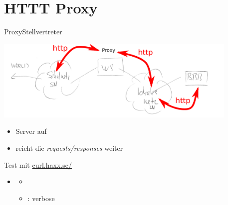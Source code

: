 \section{HTTT Proxy}

\begin{frame}{Proxy}{Stellvertreter}
  \begin{center}
 \includegraphics[width=0.875\textwidth]{proxy.pdf}
 \end{center}
 \vspace{-1.5cm}
 \begin{itemize}
  \item Server auf \host
  \item reicht die  {\em requests/responses} weiter
 \end{itemize}
\end{frame}

\begin{frame}{Test mit }{\url{curl.haxx.se/}}
  \begin{itemize}
   \item {}
   \begin{itemize}
    \item {}
    \item {} : verbose
   \end{itemize}
  \end{itemize}
\end{frame}

